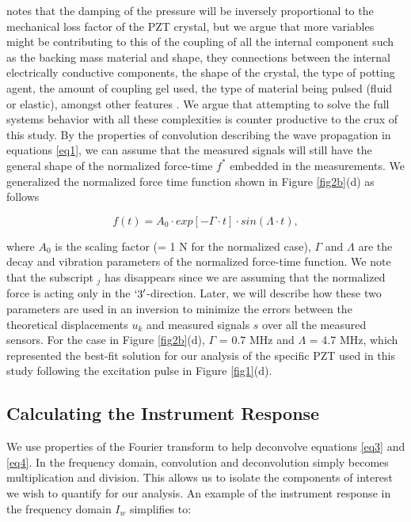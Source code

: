 \documentclass[preprint,3p, 11pt,authoryear]{elsarticle}
\begin{document}
\citet{Christensen1988} notes that the damping of the pressure will be inversely proportional to the mechanical loss factor of the PZT crystal, but we argue that more variables might be contributing to this of the coupling of all the internal component such as the backing mass material and shape, they connections between the internal electrically conductive components, the shape of the crystal, the type of potting agent, the amount of coupling gel used, the type of material being pulsed (fluid or elastic), amongst other features \citep{Glaser1998}.  We argue that attempting to solve the full systems behavior with all these complexities is counter productive to the crux of this study. By the properties of convolution describing the wave propagation in equations \eqref{eq1}, we can assume that the measured signals will still have the general shape of the normalized force-time $f^{*}$ embedded in the measurements. We generalized the normalized force time function shown in Figure \ref{fig2b}(d) as follows

\begin{equation}
    \label{eq4b}
   f(t) = A_{0} \cdot exp[- \Gamma \cdot t]\cdot sin(\Lambda\cdot t) ,
\end{equation}

\noindent where $A_{0}$ is the scaling factor (= 1 N for the normalized case), $\Gamma$ and $\Lambda$ are the decay and vibration parameters of the normalized force-time function. We note that the subscript $_{j}$ has disappears since we are assuming that the normalized force is acting only in the $`3'$-direction. Later, we will describe how these two parameters are used in an inversion to minimize the errors between the theoretical displacements $u_{k}$ and measured signals $s$ over all the measured sensors. For the case in Figure \ref{fig2b}(d), $\Gamma$ = 0.7 MHz and $\Lambda$ = 4.7 MHz, which represented the best-fit solution for our analysis of the specific PZT used in this study following the excitation pulse in Figure \ref{fig1}(d).

\subsection{Calculating the Instrument Response}

We use properties of the Fourier transform \citep{Bracewell1986} to help deconvolve equations \eqref{eq3} and \eqref{eq4}.  In the frequency domain, convolution and deconvolution simply becomes multiplication and division. This allows us to isolate the components of interest we wish to quantify for our analysis. An example of the instrument response in the frequency domain $I_{w}$ simplifies to:
\end{document}
